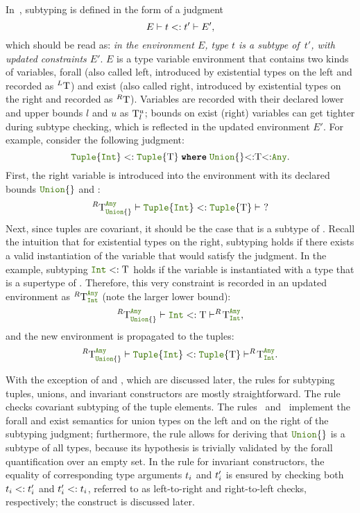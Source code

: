 In~, subtyping is defined in the form of a judgment
\[
  E \vdash t <: t' \vdash E',
\]
which should be read as:
\emph{in the environment $E$, type $t$ is a subtype of~$t'$,
with updated constraints $E'$}.
$E$ is a type variable environment that contains two kinds of variables,
forall (also called left, introduced by existential types on the left
and recorded as $^L \mathrm{T}$) and exist (also called right, introduced by 
existential types on the right and recorded as $^R \mathrm{T}$).
Variables are recorded with their declared lower and upper bounds $l$ and $u$
as $\mathrm{T}_l^u$; bounds on exist (right) variables can get tighter during subtype
checking, which is reflected in the updated environment $E'$.
For example, consider the following judgment:
\[ 
  \tupletyp{\inttyp} <: \wheret{\tupletyp{\T}}{\uniontyp{}{<:}\T{<:}\anytyp}.
\]
First, the right variable \T is introduced into the environment with its
declared bounds $\uniontyp{}$ and \anytyp:
\[ 
  ^R \T_{\uniontyp{}}^{\anytyp} \vdash \tupletyp{\inttyp} <: \tupletyp{\T} \vdash\ ?
\]
Next, since tuples are covariant, it should be the case that \inttyp is
a subtype of \T.
Recall the intuition that for existential types on the right,
subtyping holds if there exists a valid instantiation of the variable
that would satisfy the judgment.
In the example, subtyping $\inttyp <: \T$ holds if the variable \T is
instantiated with a type that is a supertype of \inttyp. Therefore, this very
constraint is recorded in an updated environment as $^R \T_{\inttyp}^{\anytyp}$
(note the larger lower bound):
\[ 
  ^R \T_{\uniontyp{}}^{\anytyp} \vdash \inttyp <: \T 
  \vdash ^R\!\T_{\inttyp}^{\anytyp},
\]
and the new environment is propagated to the tuples:
\[ 
  ^R \T_{\uniontyp{}}^{\anytyp} \vdash \tupletyp{\inttyp} <: \tupletyp{\T}
  \vdash ^R\!\T_{\inttyp}^{\anytyp}.
\]

With the exception of  and ,
which are discussed later,
the rules for subtyping tuples, unions, and invariant constructors are
mostly straightforward.
The rule~ checks covariant subtyping of the tuple elements.
The rules~ and~
implement the forall and exist semantics for union types on the left
and on the right of the subtyping judgment;
furthermore, the rule  allows for
deriving that \(\uniontyp{}\) is a subtype of all
types, because its hypothesis is trivially validated by the forall
quantification over an empty set.
In the rule  for invariant constructors,
the equality of corresponding type arguments $t_i$ and $t'_i$ is
ensured by checking both $t_i <: t'_i$ and $t'_i <: t_i$,
referred to as left-to-right and right-to-left checks, respectively;
the \Barrier construct is discussed later.

